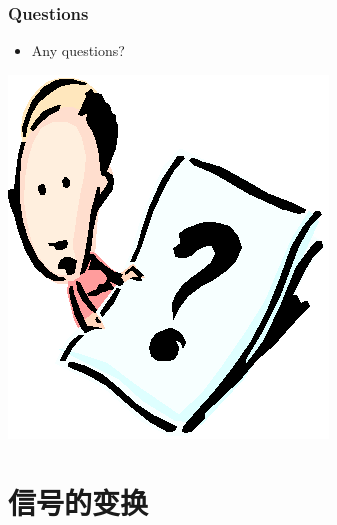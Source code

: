 \documentclass[CJKutf8,dvipsnames,table]{beamer}
\begin{document}
\begin{CJK*}{UTF8}{song}
  \begin{frame}
    \frametitle{Questions}
    \begin{itemize}
    \item Any questions?
    \end{itemize}
    \begin{center}
      \includegraphics[scale=.5]{question}
    \end{center}
  \end{frame}
  
  \section{信号的变换}
  

\end{CJK*}
\end{document}
